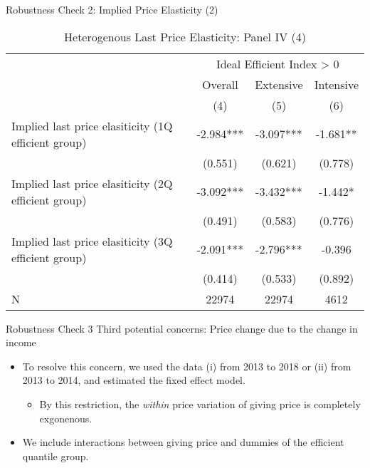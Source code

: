 \documentclass[
  ignorenonframetext,
]{beamer}
\providecommand{\tightlist}{%
  \setlength{\itemsep}{0pt}\setlength{\parskip}{0pt}}
\begin{document}
\begin{frame}{Robustness Check 2: Implied Price Elasticity (2)}
\protect\hypertarget{robustness-check-2-implied-price-elasticity-2}{}
\begin{table}

\caption{\label{tab:kableHeteroLastElasticitySlide4}Heterogenous Last Price Elasticity: Panel IV (4)}
\centering
\fontsize{8}{10}\selectfont
\begin{tabular}[t]{lccc}
\toprule
\multicolumn{1}{c}{ } & \multicolumn{3}{c}{Ideal Efficient Index > 0} \\
\cmidrule(l{3pt}r{3pt}){2-4}
\multicolumn{1}{c}{ } & \multicolumn{1}{c}{Overall} & \multicolumn{1}{c}{Extensive} & \multicolumn{1}{c}{Intensive} \\
\cmidrule(l{3pt}r{3pt}){2-2} \cmidrule(l{3pt}r{3pt}){3-3} \cmidrule(l{3pt}r{3pt}){4-4}
 & (4) & (5) & (6)\\
\midrule
Implied last price elasiticity (1Q efficient group) & -2.984*** & -3.097*** & -1.681**\\
 & (0.551) & (0.621) & (0.778)\\
Implied last price elasiticity (2Q efficient group) & -3.092*** & -3.432*** & -1.442*\\
 & (0.491) & (0.583) & (0.776)\\
Implied last price elasiticity (3Q efficient group) & -2.091*** & -2.796*** & -0.396\\
 & (0.414) & (0.533) & (0.892)\\
N & 22974 & 22974 & 4612\\
\bottomrule
\end{tabular}
\end{table}
\end{frame}

\begin{frame}{Robustness Check 3}
\protect\hypertarget{robustness-check-3-1}{}
Third potential concerns: Price change due to the change in income

\begin{itemize}
\tightlist
\item
  To resolve this concern, we used the data (i) from 2013 to 2018 or (ii) from 2013 to 2014, and estimated the fixed effect model.

  \begin{itemize}
  \tightlist
  \item
    By this restriction, the \emph{within} price variation of giving price is completely exgonenous.
  \end{itemize}
\item
  We include interactions between giving price and dummies of the efficient quantile group.
\end{itemize}
\end{frame}
\end{document}
